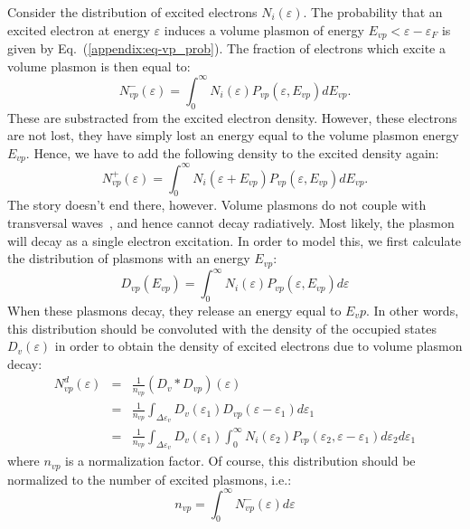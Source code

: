\begin{refsection}
Consider the distribution of excited electrons $N_i(\varepsilon)$. The 
probability that an excited electron at energy $\varepsilon$ induces a volume 
plasmon of energy $E_{vp} < \varepsilon - \varepsilon_F$ is given by Eq.~(\ref{appendix:eq-vp_prob}). The fraction of electrons which excite a volume plasmon is then equal to: 
\begin{equation} 
    N_{vp}^{-}(\varepsilon) = \int_0^\infty N_i(\varepsilon) 
P_{vp}(\varepsilon, E_{vp}) dE_{vp}. 
\end{equation} 
These are substracted from the excited electron density. However, these 
electrons are not lost, they have simply lost an energy equal to the volume 
plasmon energy $E_{vp}$. Hence, we have to add the following density to the 
excited density again: 
\begin{equation} 
    N_{vp}^{+}(\varepsilon) = \int_0^\infty N_i(\varepsilon + E_{vp}) 
P_{vp}(\varepsilon, E_{vp}) dE_{vp}. 
\end{equation} 
The story doesn't end there, however. Volume plasmons do not couple with 
transversal waves~\cite{Maier2007}, and hence cannot decay radiatively. Most likely, the 
plasmon will decay as a single electron excitation. In order to model this, we 
first calculate the distribution of plasmons with an energy $E_{vp}$: 
\begin{equation} 
    D_{vp} (E_{vp})= \int_0^\infty N_i(\varepsilon) P_{vp}(\varepsilon, 
E_{vp}) d\varepsilon 
\end{equation} 
When these plasmons decay, they release an energy equal to $E_vp$. In other 
words, this distribution should be convoluted with the density of the occupied 
states $D_v(\varepsilon)$ in order to obtain the density of excited electrons 
due to volume plasmon decay: 
\begin{eqnarray} 
    N_{vp}^{d}(\varepsilon) &=& \frac{1}{n_{vp}}(D_v * D_{vp}) (\varepsilon) 
\\ 
    &=& \frac{1}{n_{vp}} \int_{\Delta\varepsilon_v} D_v(\varepsilon_1) 
D_{vp}(\varepsilon - \varepsilon_1) d\varepsilon_1 \\ 
    &=& \frac{1}{n_{vp}} \int_{\Delta\varepsilon_v} D_v(\varepsilon_1)  
    \int_0^\infty N_i(\varepsilon_2) P_{vp}(\varepsilon_2, \varepsilon - 
\varepsilon_1) d\varepsilon_2 d\varepsilon_1  
\end{eqnarray} 
where $n_{vp}$ is a normalization factor. Of course, this distribution should 
be normalized to the number of excited plasmons, i.e.: 
\begin{equation} 
    n_{vp} = \int_0^\infty N_{vp}^{-}(\varepsilon) d\varepsilon 
\end{equation} 


\end{refsection}
